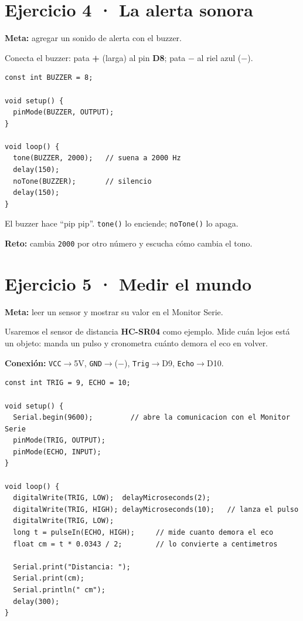 \documentclass[10pt,letterpaper]{article}
\begin{document}
\section{Ejercicio 4 · La alerta sonora}
\begin{objetivo}\textbf{Meta:} agregar un sonido de alerta con el buzzer.\end{objetivo}

Conecta el buzzer: pata \textbf{+} (larga) al pin \textbf{D8}; pata $-$ al riel azul ($-$).

\begin{lstlisting}[style=arduino]
const int BUZZER = 8;

void setup() {
  pinMode(BUZZER, OUTPUT);
}

void loop() {
  tone(BUZZER, 2000);   // suena a 2000 Hz
  delay(150);
  noTone(BUZZER);       // silencio
  delay(150);
}
\end{lstlisting}

\begin{veras}El buzzer hace ``pip pip''. \texttt{tone()} lo enciende; \texttt{noTone()} lo apaga.\end{veras}
\begin{reto}\textbf{Reto:} cambia \texttt{2000} por otro número y escucha cómo cambia el tono.\end{reto}

\section{Ejercicio 5 · Medir el mundo}
\begin{objetivo}\textbf{Meta:} leer un sensor y mostrar su valor en el Monitor Serie.\end{objetivo}

Usaremos el sensor de distancia \textbf{HC-SR04} como ejemplo. Mide cuán lejos está un objeto:
manda un pulso y cronometra cuánto demora el eco en volver.

\textbf{Conexión:} \texttt{VCC}$\rightarrow$5V, \texttt{GND}$\rightarrow$($-$),
\texttt{Trig}$\rightarrow$D9, \texttt{Echo}$\rightarrow$D10.

\begin{lstlisting}[style=arduino]
const int TRIG = 9, ECHO = 10;

void setup() {
  Serial.begin(9600);         // abre la comunicacion con el Monitor Serie
  pinMode(TRIG, OUTPUT);
  pinMode(ECHO, INPUT);
}

void loop() {
  digitalWrite(TRIG, LOW);  delayMicroseconds(2);
  digitalWrite(TRIG, HIGH); delayMicroseconds(10);   // lanza el pulso
  digitalWrite(TRIG, LOW);
  long t = pulseIn(ECHO, HIGH);     // mide cuanto demora el eco
  float cm = t * 0.0343 / 2;        // lo convierte a centimetros

  Serial.print("Distancia: ");
  Serial.print(cm);
  Serial.println(" cm");
  delay(300);
}
\end{lstlisting}
\end{document}
